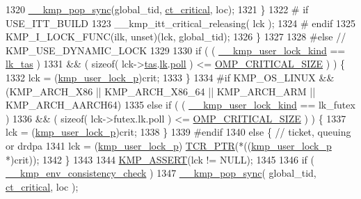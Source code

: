 \begin{DoxyCode}
{1320             \hyperlink{kmp__error_8c_ab716717d70650eeeb205b057232d7c1c}{\_\_kmp\_pop\_sync}(global\_tid, \hyperlink{kmp_8h_a1582e7ddc609220a660d10244ef3e315a99f163854d01ce42ec99e6353d3907c6}{ct\_critical}, loc);
1321         \}
1322 \textcolor{preprocessor}{# if USE\_ITT\_BUILD}
1323 \textcolor{preprocessor}{}        \_\_kmp\_itt\_critical\_releasing( lck );
1324 \textcolor{preprocessor}{# endif}
1325 \textcolor{preprocessor}{}        KMP\_I\_LOCK\_FUNC(ilk, unset)(lck, global\_tid);
1326     \}
1327 
1328 \textcolor{preprocessor}{#else // KMP\_USE\_DYNAMIC\_LOCK}
1329 \textcolor{preprocessor}{}
1330     \textcolor{keywordflow}{if} ( ( \hyperlink{kmp__lock_8cpp_a0e6c33ed4cfc6430f93288ca2c2bfebe}{\_\_kmp\_user\_lock\_kind} == \hyperlink{kmp__lock_8h_a8311c5b02d0737c62b10926473f6c51eae38ddd756bdb44cee826f0c40f1b32ba}{lk\_tas} )
1331       && ( \textcolor{keyword}{sizeof}( lck->\hyperlink{unionkmp__user__lock_ac0b526819ee392b205697ed5786ccf3f}{tas}.\hyperlink{unionkmp__tas__lock_ad51358485337a210e18f4ea9cbe6477a}{lk}.\hyperlink{structkmp__base__tas__lock_a32c35f002d15ce50345770498ab6b0c0}{poll} ) <= \hyperlink{kmp__lock_8h_ae4248e556b3988e66a875212cf902da6}{OMP\_CRITICAL\_SIZE} ) ) \{
1332         lck = (\hyperlink{kmp__lock_8h_a35c88b3ea74b2a8d633ec8156c1c4670}{kmp\_user\_lock\_p})crit;
1333     \}
1334 \textcolor{preprocessor}{#if KMP\_OS\_LINUX && (KMP\_ARCH\_X86 || KMP\_ARCH\_X86\_64 || KMP\_ARCH\_ARM || KMP\_ARCH\_AARCH64)}
1335 \textcolor{preprocessor}{}    \textcolor{keywordflow}{else} \textcolor{keywordflow}{if} ( ( \hyperlink{kmp__lock_8cpp_a0e6c33ed4cfc6430f93288ca2c2bfebe}{\_\_kmp\_user\_lock\_kind} == lk\_futex )
1336       && ( \textcolor{keyword}{sizeof}( lck->futex.lk.poll ) <= \hyperlink{kmp__lock_8h_ae4248e556b3988e66a875212cf902da6}{OMP\_CRITICAL\_SIZE} ) ) \{
1337         lck = (\hyperlink{kmp__lock_8h_a35c88b3ea74b2a8d633ec8156c1c4670}{kmp\_user\_lock\_p})crit;
1338     \}
1339 \textcolor{preprocessor}{#endif}
1340 \textcolor{preprocessor}{}    \textcolor{keywordflow}{else} \{ \textcolor{comment}{// ticket, queuing or drdpa}
1341         lck = (\hyperlink{kmp__lock_8h_a35c88b3ea74b2a8d633ec8156c1c4670}{kmp\_user\_lock\_p}) \hyperlink{kmp__os_8h_a6e40f65c18c7b47fb612607b9bf8fdfc}{TCR\_PTR}(*((\hyperlink{unionkmp__user__lock}{kmp\_user\_lock\_p} *)crit));
1342     \}
1343 
1344     \hyperlink{kmp__debug_8h_a5323a368e8ba273b17c46906dd9ec78c}{KMP\_ASSERT}(lck != NULL);
1345 
1346     \textcolor{keywordflow}{if} ( \hyperlink{kmp_8h_ab4062d4f566c901230e51490a8819ba0}{\_\_kmp\_env\_consistency\_check} )
1347         \hyperlink{kmp__error_8c_ab716717d70650eeeb205b057232d7c1c}{\_\_kmp\_pop\_sync}( global\_tid, \hyperlink{kmp_8h_a1582e7ddc609220a660d10244ef3e315a99f163854d01ce42ec99e6353d3907c6}{ct\_critical}, loc );
}
\end{DoxyCode}

